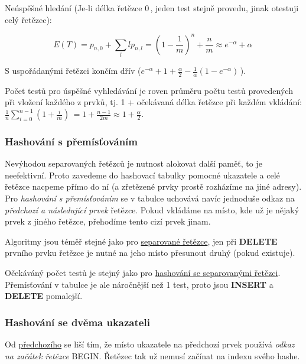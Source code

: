 Neúspěšné hledání (Je-li délka řetězce \(0\,\!\), jeden test stejně
provedu, jinak otestuji celý řetězec):

\[E(T) = p_{n,0} + \sum_l l p_{n,l} = (1-\frac{1}{m})^n + \frac{n}{m} \approx e^{-\alpha} + \alpha\,\!\]

S uspořádanými řetězci končím dřív
(\(e^{-\alpha}+1+\frac{\alpha}{2}-\frac{1}{\alpha}(1-e^{-\alpha})\,\!\)).

Počet testů pro úspěšné vyhledávání je roven průměru počtu testů
provedených při vložení každého z prvků, tj. 1 + očekávaná délka řetězce
při každém vkládání:
\(\frac{1}{n}\sum_{i=0}^{n-1}\left(1+\frac{i}{m}\right)\,\! = 1 + \frac{n-1}{2m} \approx 1 + \frac{\alpha}{2}\).

\subsubsection{Hashování s
přemísťováním}\label{hashovuxe1nuxed-s-pux159emuxedsux165ovuxe1nuxedm}

Nevýhodou separovaných řetězců je nutnost alokovat další paměť, to je
neefektivní. Proto zavedeme do hashovací tabulky pomocné ukazatele a
celé řetězce nacpeme přímo do ní (a zřetězené prvky prostě rozházíme na
jiné adresy). Pro \emph{hashování s přemísťováním} se v tabulce uchovává
navíc jednoduše odkaz na \emph{předchozí a následující prvek} řetězce.
Pokud vkládáme na místo, kde už je nějaký prvek z jiného řetězce,
přehodíme tento cizí prvek jinam.

Algoritmy jsou téměř stejné jako pro
\protect\hyperlink{Hashovuxe1nuxed_se_separovanuxfdmi_ux159etux11bzci}{separované
řetězce}, jen při \textbf{DELETE} prvního prvku řetězce je nutné na jeho
místo přesunout druhý (pokud existuje).

Očekáváný počet testů je stejný jako pro
\protect\hyperlink{Hashovuxe1nuxed_se_separovanuxfdmi_ux159etux11bzci}{hashování
se separovanými řetězci}. Přemísťování v tabulce je ale náročnější než 1
test, proto jsou \textbf{INSERT} a \textbf{DELETE} pomalejší.

\subsubsection{Hashování se dvěma
ukazateli}\label{hashovuxe1nuxed-se-dvux11bma-ukazateli}

Od
\protect\hyperlink{Hashovuxe1nuxed_s_pux159emuxedsux165ovuxe1nuxedm}{předchozího}
se liší tím, že místo ukazatele na předchozí prvek používá \emph{odkaz
na začátek řetězce} BEGIN. Řetězec tak už nemusí začínat na indexu svého
hashe.


